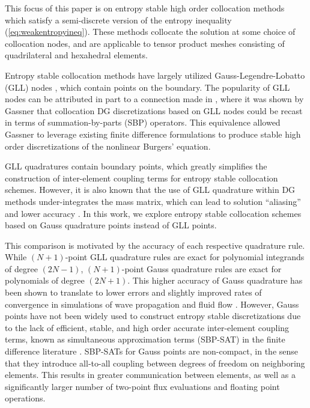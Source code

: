 \documentclass[review,onefignum,onetabnum,final]{siamart171218}
\begin{document}
This focus of this paper is on entropy stable high order collocation methods which satisfy a semi-discrete version of the entropy inequality (\ref{eq:weakentropyineq}).  These methods collocate the solution at some choice of collocation nodes, and are applicable to tensor product meshes consisting of quadrilateral and hexahedral elements.  

Entropy stable collocation methods have largely utilized Gauss-Legendre-Lobatto (GLL) nodes \cite{fisher2013high, carpenter2014entropy, gassner2016split, gassner2017br1}, which contain points on the boundary.  The popularity of GLL nodes can be attributed in part to a connection made in \cite{gassner2013skew}, where it was shown by Gassner that collocation DG discretizations based on GLL nodes could be recast in terms of summation-by-parts (SBP) operators.  This equivalence allowed Gassner to leverage existing finite difference formulations to produce stable high order discretizations of the nonlinear Burgers' equation.  

GLL quadratures contain boundary points, which greatly simplifies the construction of inter-element coupling terms for entropy stable collocation schemes.  However, it is also known that the use of GLL quadrature within DG methods under-integrates the mass matrix, which can lead to solution ``aliasing'' and lower accuracy \cite{parsani2016entropy}.  In this work, we explore entropy stable collocation schemes based on Gauss quadrature points instead of GLL points.  

This comparison is motivated by the accuracy of each respective quadrature rule.  While $(N+1)$-point GLL quadrature rules are exact for polynomial integrands of degree $(2N-1)$, $(N+1)$-point Gauss quadrature rules are exact for polynomials of degree $(2N+1)$.  This higher accuracy of Gauss quadrature has been shown to translate to lower errors and slightly improved rates of convergence in simulations of wave propagation and fluid flow \cite{kopriva2010quadrature, hindenlang2012explicit, chan2015gpu}.  However, Gauss points have not been widely used to construct entropy stable discretizations due to the lack of efficient, stable, and high order accurate inter-element coupling terms, known as simultaneous approximation terms (SBP-SAT) in the finite difference literature \cite{fernandez2014review, crean2017high, fernandez2018simultaneous}.  SBP-SATs for Gauss points are non-compact, in the sense that they introduce all-to-all coupling between degrees of freedom on neighboring elements.  This results in greater communication between elements, as well as a significantly larger number of two-point flux evaluations and floating point operations.  
\end{document}
